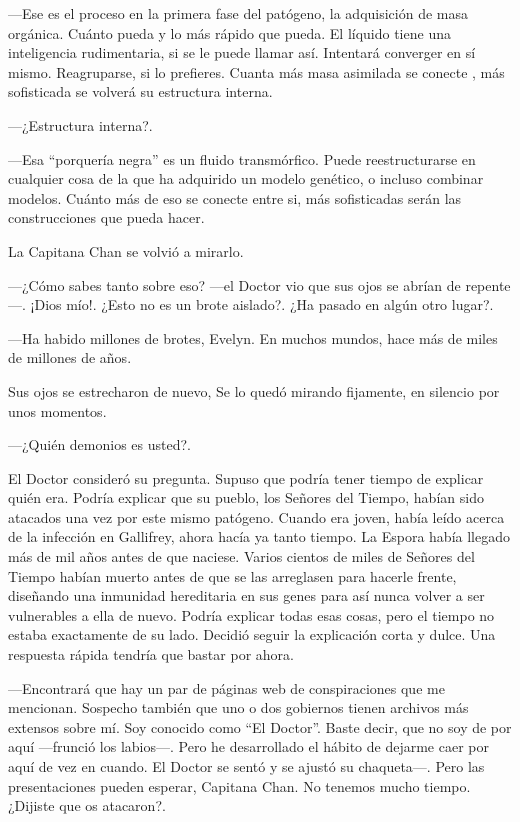 ---Ese es el proceso en la primera fase del patógeno, la adquisición de
masa orgánica. Cuánto pueda y lo más rápido que pueda. El líquido tiene
una inteligencia rudimentaria, si se le puede llamar así. Intentará
converger en sí mismo. Reagruparse, si lo prefieres. Cuanta más masa
asimilada se conecte , más sofisticada se volverá su estructura interna.

---¿Estructura interna?.

---Esa ``porquería negra'' es un fluido transmórfico. Puede
reestructurarse en cualquier cosa de la que ha adquirido un modelo
genético, o incluso combinar modelos. Cuánto más de eso se conecte entre
si, más sofisticadas serán las construcciones que pueda hacer.

La Capitana Chan se volvió a mirarlo.

---¿Cómo sabes tanto sobre eso? ---el Doctor vio que sus ojos se abrían
de repente---. ¡Dios mío!. ¿Esto no es un brote aislado?. ¿Ha pasado en
algún otro lugar?.

---Ha habido millones de brotes, Evelyn. En muchos mundos, hace más de
miles de millones de años.

Sus ojos se estrecharon de nuevo, Se lo quedó mirando fijamente, en
silencio por unos momentos.

---¿Quién demonios es usted?.

El Doctor consideró su pregunta. Supuso que podría tener tiempo de
explicar quién era. Podría explicar que su pueblo, los Señores del
Tiempo, habían sido atacados una vez por este mismo patógeno. Cuando era
joven, había leído acerca de la infección en Gallifrey, ahora hacía ya
tanto tiempo. La Espora había llegado más de mil años antes de que
naciese. Varios cientos de miles de Señores del Tiempo habían muerto
antes de que se las arreglasen para hacerle frente, diseñando una
inmunidad hereditaria en sus genes para así nunca volver a ser
vulnerables a ella de nuevo. Podría explicar todas esas cosas, pero el
tiempo no estaba exactamente de su lado. Decidió seguir la explicación
corta y dulce. Una respuesta rápida tendría que bastar por ahora.

---Encontrará que hay un par de páginas web de conspiraciones que me
mencionan. Sospecho también que uno o dos gobiernos tienen archivos más
extensos sobre mí. Soy conocido como ``El Doctor''. Baste decir, que no
soy de por aquí ---frunció los labios---. Pero he desarrollado el hábito
de dejarme caer por aquí de vez en cuando. El Doctor se sentó y se
ajustó su chaqueta---. Pero las presentaciones pueden esperar, Capitana
Chan. No tenemos mucho tiempo. ¿Dijiste que os atacaron?.

